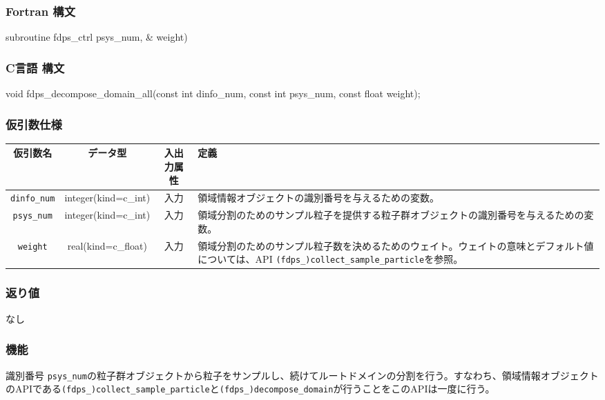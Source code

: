 \subsubsection*{Fortran 構文}
\begin{screen}
\begin{spverbatim}
subroutine fdps_ctrl%
                                          psys_num,  &
                                          weight)
\end{spverbatim}
\end{screen}

\subsubsection*{C言語 構文}
\begin{screen}
\begin{spverbatim}
void fdps_decompose_domain_all(const int dinfo_num, 
                               const int psys_num,  
                               const float weight); 
\end{spverbatim}
\end{screen}



\subsubsection*{仮引数仕様}
\begin{table}[h]
\begin{tabularx}{\linewidth}{cccX}
\toprule
\rowcolor{Snow2}
仮引数名 & データ型 & 入出力属性 & 定義 \\
\midrule
\texttt{dinfo\_num} & integer(kind=c\_int) & 入力 & 領域情報オブジェクトの識別番号を与えるための変数。\\
\texttt{psys\_num} & integer(kind=c\_int) & 入力 & 領域分割のためのサンプル粒子を提供する粒子群オブジェクトの識別番号を与えるための変数。 \\
\texttt{weight} & real(kind=c\_float) & 入力 & 領域分割のためのサンプル粒子数を決めるためのウェイト。ウェイトの意味とデフォルト値については、API \texttt{(fdps\_)collect\_sample\_particle}を参照。\\
\bottomrule
\end{tabularx}
\end{table}

\subsubsection*{返り値}
なし

\subsubsection*{機能}
識別番号 \texttt{psys\_num}の粒子群オブジェクトから粒子をサンプルし、続けてルートドメインの分割を行う。すなわち、領域情報オブジェクトのAPIである\texttt{(fdps\_)collect\_sample\_particle}と\texttt{(fdps\_)decompose\_domain}が行うことをこのAPIは一度に行う。

\clearpage
